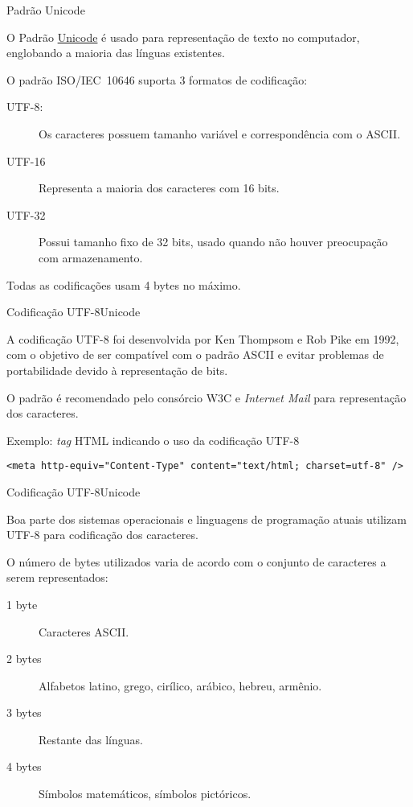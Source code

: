 \begin{frame}{Padrão Unicode}
  
  O Padrão \alert{\href{http://www.unicode.org/}{Unicode}} é usado
  para representação de texto no computador, englobando a maioria das
  línguas existentes.

  O padrão ISO/IEC~10646 suporta 3 formatos de codificação:

  \begin{description}
  \item[UTF-8:] Os caracteres possuem tamanho variável e correspondência com o ASCII.
  \item[UTF-16] Representa a maioria dos caracteres com 16 bits.
  \item[UTF-32] Possui tamanho fixo de 32 bits, usado quando não houver preocupação com 
    armazenamento.
  \end{description}
  
  Todas as codificações usam 4 bytes no máximo.

\end{frame}

\begin{frame}{Codificação UTF-8}{Unicode}
  
  A codificação UTF-8 foi desenvolvida por Ken Thompsom e Rob Pike em
  1992, com o objetivo de ser compatível com o padrão ASCII e evitar
  problemas de portabilidade devido à representação de bits.\medskip

  O padrão é recomendado pelo consórcio W3C e {\em Internet Mail} para
  representação dos caracteres.\medskip
  
  Exemplo: {\em tag} HTML indicando o uso da codificação UTF-8\medskip 
 
  {\tt <meta http-equiv="Content-Type" content="text/html; charset=utf-8" />}
  

\end{frame}

\begin{frame}{Codificação UTF-8}{Unicode}
  
  Boa parte dos sistemas operacionais e linguagens de programação
  atuais utilizam UTF-8 para codificação dos caracteres.\medskip
  
  O número de bytes utilizados varia de acordo com o conjunto de
  caracteres a serem representados:

  \begin{description}
  \item[1 byte] Caracteres ASCII.
  \item[2 bytes] Alfabetos latino, grego, cirílico, arábico, hebreu, armênio.
  \item[3 bytes] Restante das línguas.
  \item[4 bytes] Símbolos matemáticos, símbolos pictóricos.
  \end{description}

\end{frame}
